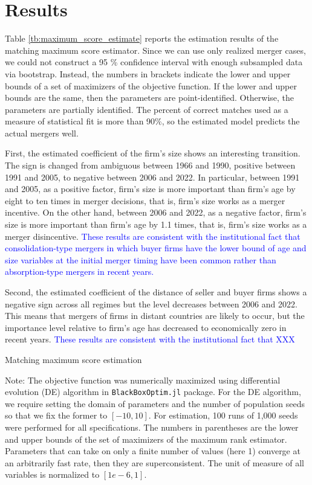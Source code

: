 \documentclass[10pt]{article}
\begin{document}
\section{Results}\label{sec:results}

Table \ref{tb:maximum_score_estimate} reports the estimation results of the matching maximum score estimator. 
Since we can use only realized merger cases, we could not construct a 95 \% confidence interval with enough subsampled data via bootstrap.
Instead, the numbers in brackets indicate the lower and upper bounds of a set of maximizers of the objective function. 
If the lower and upper bounds are the same, then the parameters are point-identified. 
Otherwise, the parameters are partially identified.
The percent of correct matches used as a measure of statistical fit is more than 90\%, so the estimated model predicts the actual mergers well.

First, the estimated coefficient of the firm's size shows an interesting transition. 
The sign is changed from ambiguous between 1966 and 1990, positive between 1991 and 2005, to negative between 2006 and 2022. 
In particular, between 1991 and 2005, as a positive factor, firm's size is more important than firm's age by eight to ten times in merger decisions, that is, firm's size works as a merger incentive.
On the other hand, between 2006 and 2022, as a negative factor, firm's size is more important than firm's age by 1.1 times, that is, firm's size works as a merger disincentive.
\textcolor{blue}{These results are consistent with the institutional fact that consolidation-type mergers in which buyer firms have the lower bound of age and size variables at the initial merger timing have been common rather than absorption-type mergers in recent years.}

Second, the estimated coefficient of the distance of seller and buyer firms shows a negative sign across all regimes but the level decreases between 2006 and 2022. 
This means that mergers of firms in distant countries are likely to occur, but the importance level relative to firm's age has decreased to economically zero in recent years.
\textcolor{blue}{These results are consistent with the institutional fact that XXX}

\begin{table}[!htbp]
  \begin{center}
      \caption{Matching maximum score estimation}
      \label{tb:maximum_score_estimate} 
      
  \end{center}\footnotesize
  Note: The objective function was numerically maximized using differential evolution (DE) algorithm in \texttt{BlackBoxOptim.jl} package. For the DE algorithm, we require setting the domain of parameters and the number of population seeds so that we fix the former to $[-10, 10]$. For estimation, 100 runs of 1,000 seeds were performed for all specifications. The numbers in parentheses are the lower and upper bounds of the set of maximizers of the maximum rank estimator. Parameters that can take on only a finite number of values (here 1) converge at an arbitrarily fast rate, then they are superconsistent. The unit of measure of all variables is normalized to $[1e-6,1]$. 
\end{table} 
\end{document}
